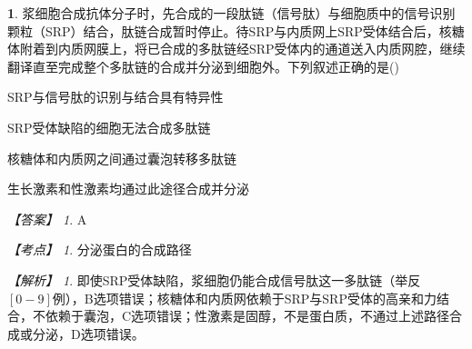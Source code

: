 \documentclass[UTF8, 10pt, a4paper, oneside]{ctexart}
\theoremstyle{definition}
\newtheorem{exercise}{}
\theoremstyle{remark}
\newtheorem*{answer}{【答案】}
\newtheorem*{point}{【考点】}      %
\newtheorem*{explanation}{【解析】}     %
\theoremstyle{plain}
\begin{document}
\begin{exercise}
浆细胞合成抗体分子时，先合成的一段肽链（信号肽）与细胞质中的信号识别颗粒（SRP）结合，肽链合成暂时停止。待SRP与内质网上SRP受体结合后，核糖体附着到内质网膜上，将已合成的多肽链经SRP受体内的通道送入内质网腔，继续翻译直至完成整个多肽链的合成并分泌到细胞外。下列叙述正确的是\quad(\quad)
    \begin{adjustwidth}{2em}{}
            \begin{asparaenum}[A. ]
                \item SRP与信号肽的识别与结合具有特异性
                \item SRP受体缺陷的细胞无法合成多肽链
                \item 核糖体和内质网之间通过囊泡转移多肽链
                \item 生长激素和性激素均通过此途径合成并分泌
            \end{asparaenum}
    \end{adjustwidth}
    \begin{answer}
        A
    \end{answer}
    \begin{point}
        分泌蛋白的合成路径
    \end{point}
    \begin{explanation}
        即使SRP受体缺陷，浆细胞仍能合成信号肽这一多肽链（举反\([0-9]\)例），B选项错误；核糖体和内质网依赖于SRP与SRP受体的高亲和力结合，不依赖于囊泡，C选项错误；性激素是固醇，不是蛋白质，不通过上述路径合成或分泌，D选项错误。
    \end{explanation}
\end{exercise}
\end{document}
